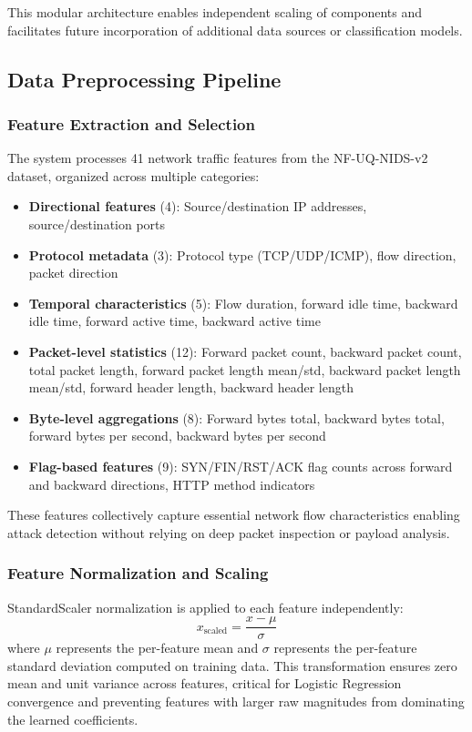 \documentclass[conference]{IEEEtran}
\begin{document}
This modular architecture enables independent scaling of components and facilitates future incorporation of additional data sources or classification models.

\subsection{Data Preprocessing Pipeline}

\subsubsection{Feature Extraction and Selection}

The system processes 41 network traffic features from the NF-UQ-NIDS-v2 dataset, organized across multiple categories:

\begin{itemize}
    \item \textbf{Directional features} (4): Source/destination IP addresses, source/destination ports
    \item \textbf{Protocol metadata} (3): Protocol type (TCP/UDP/ICMP), flow direction, packet direction
    \item \textbf{Temporal characteristics} (5): Flow duration, forward idle time, backward idle time, forward active time, backward active time
    \item \textbf{Packet-level statistics} (12): Forward packet count, backward packet count, total packet length, forward packet length mean/std, backward packet length mean/std, forward header length, backward header length
    \item \textbf{Byte-level aggregations} (8): Forward bytes total, backward bytes total, forward bytes per second, backward bytes per second
    \item \textbf{Flag-based features} (9): SYN/FIN/RST/ACK flag counts across forward and backward directions, HTTP method indicators
\end{itemize}

These features collectively capture essential network flow characteristics enabling attack detection without relying on deep packet inspection or payload analysis.

\subsubsection{Feature Normalization and Scaling}

StandardScaler normalization is applied to each feature independently:
\begin{equation}
x_{\text{scaled}} = \frac{x - \mu}{\sigma}
\end{equation}
where $\mu$ represents the per-feature mean and $\sigma$ represents the per-feature standard deviation computed on training data. This transformation ensures zero mean and unit variance across features, critical for Logistic Regression convergence and preventing features with larger raw magnitudes from dominating the learned coefficients.
\end{document}
